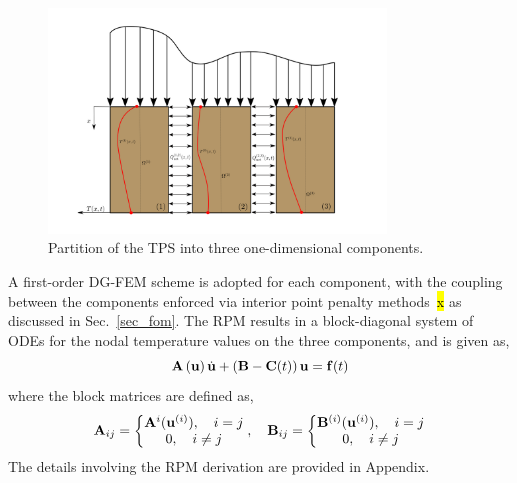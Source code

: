 \begin{figure}
    \centering
    \includegraphics[width=0.8\textwidth]{./figs/three_components.png}
    \caption{Partition of the TPS into three one-dimensional components.}
    \label{fig_domain_partition}
\end{figure}

A first-order DG-FEM scheme is adopted for each component, with the coupling between the components enforced via interior point penalty methods~\hl{x} as discussed in Sec.~\ref{sec_fom}. The RPM results in a block-diagonal system of ODEs for the nodal temperature values on the three components, and is given as,
\begin{equation}
    \mathbf{A}\left(\mathbf{u}\right)\dot{\mathbf{u}} + \left(\mathbf{B} - \mathbf{C}(t)\right)\mathbf{u} = \mathbf{f}(t)\label{eqn_rpm}
\end{equation}
where the block matrices are defined as,
\begin{equation}
    \mathbf{A}_{ij} = \left\{\begin{matrix}
        \mathbf{A}^{i}(\mathbf{u}^{(i)}),\quad i=j\\
        0,\quad i\neq j
    \end{matrix}\right.,\quad \mathbf{B}_{ij} = \left\{\begin{matrix}
        \mathbf{B}^{(i)}(\mathbf{u}^{(i)}),\quad i=j\\
        0,\quad i\neq j
    \end{matrix}\right.
\end{equation}
The details involving the RPM derivation are provided in Appendix.

